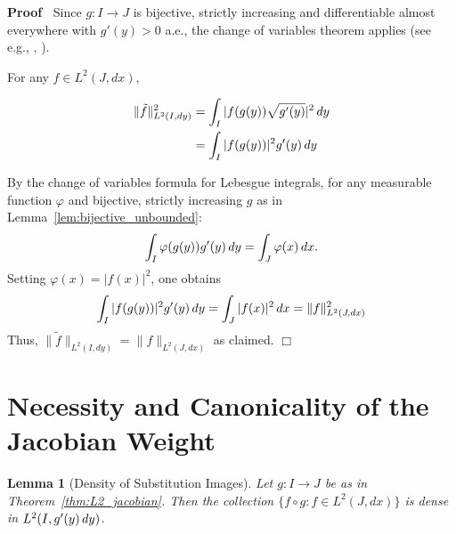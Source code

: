 \documentclass{article}
\newenvironment{proof}{\noindent\textbf{Proof\ }}{\hspace*{\fill}$\Box$\medskip}
\newtheorem{lemma}{Lemma}
\begin{document}
\begin{proof}
  Since $g : I \to J$ is bijective, strictly increasing and differentiable
  almost everywhere with $g' (y) > 0$ a.e., the change of variables theorem
  applies (see e.g., {\cite{RoydenFitzpatrick}}, {\cite{Folland}}).
  
  For any $f \in L^2 (J, dx)$,
  
  \begin{align}
    \| \tilde{f} \|_{L^2 (I, dy)}^2 & = \int_I |f (g (y)) \sqrt{g' (y)} |^2 
    \hspace{0.17em} dy  \label{eq:normexpansion1}\\
    & = \int_I |f (g (y)) |^2 g' (y)  \hspace{0.17em} dy 
    \label{eq:normexpansion2}
  \end{align}
  
  By the change of variables formula for Lebesgue integrals, for any
  measurable function $\varphi$ and bijective, strictly increasing $g$ as in
  Lemma~\ref{lem:bijective_unbounded}:
  \begin{equation}
    \label{eq:cov} \int_I \varphi (g (y)) g' (y)  \hspace{0.17em} dy = \int_J
    \varphi (x)  \hspace{0.17em} dx.
  \end{equation}
  Setting $\varphi (x) = |f (x) |^2$, one obtains
  \begin{equation}
    \int_I |f (g (y)) |^2 g' (y) \hspace{0.17em} dy = \int_J |f (x) |^2 
    \hspace{0.17em} dx = \|f\|_{L^2 (J, dx)}^2 \label{eq:aftercov}
  \end{equation}
  Thus, $\| \tilde{f} \|_{L^2 (I, dy)} = \|f\|_{L^2 (J, dx)}$ as claimed.
\end{proof}

\section{Necessity and Canonicality of the Jacobian Weight}

\begin{lemma}
  [Density of Substitution Images]\label{lem:L2density} Let $g : I \rightarrow
  J$ be as in Theorem~\ref{thm:L2_jacobian}. Then the collection $\{f \circ g
  : f \in L^2 (J, dx)\}$ is dense in $L^2 (I, g' (y) \hspace{0.17em} dy)$.
\end{lemma}
\end{document}
